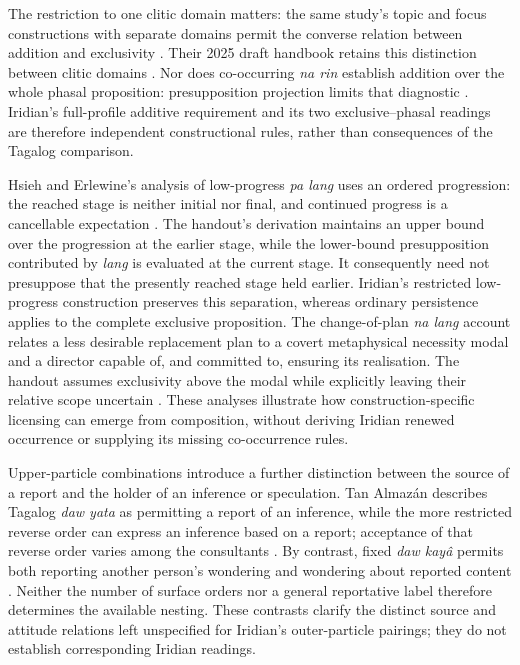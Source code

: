 The restriction to one clitic domain matters: the same study's topic and
focus constructions with separate domains permit the converse relation
between addition and exclusivity \cite[§4.2, fn.~5]{hsieherlewine2024}.
Their 2025 draft handbook retains this distinction between clitic domains
\cite[§4.2]{hsieherlewine2025handbook}. Nor does co-occurring \textit{na rin} establish addition over the whole
phasal proposition: presupposition projection limits that diagnostic
\cite[appendix~A]{hsieherlewine2024}. Iridian's full-profile additive
requirement and its two exclusive--phasal readings are therefore independent
constructional rules, rather than consequences of the Tagalog comparison.

Hsieh and Erlewine's analysis of low-progress \textit{pa lang}
uses an ordered progression: the reached stage is neither initial nor final,
and continued progress is a cancellable expectation
\cite[§4, pp.~5--7]{hsieherlewine2023nthu}. The handout's derivation maintains an upper
bound over the progression at the earlier stage, while the lower-bound
presupposition contributed by \textit{lang} is evaluated at the current
stage. It consequently need not presuppose that the presently reached stage
held earlier. Iridian's restricted low-progress construction preserves this
separation, whereas ordinary persistence applies to the complete exclusive
proposition. The change-of-plan \textit{na lang} account relates a less desirable
replacement plan to a covert metaphysical necessity modal and a director
capable of, and committed to, ensuring its realisation. The handout assumes
exclusivity above the modal while explicitly leaving their relative scope
uncertain \cite[§5, pp.~7--9]{hsieherlewine2023nthu}.
These analyses illustrate how construction-specific licensing can emerge
from composition, without deriving Iridian renewed occurrence or supplying
its missing co-occurrence rules.

Upper-particle combinations introduce a further distinction between the
source of a report and the holder of an inference or speculation. Tan
Almazán describes Tagalog \textit{daw yata} as permitting a report of an
inference, while the more restricted reverse order can express an inference
based on a report; acceptance of that reverse order varies among the
consultants \cite[§3.3.2.2.2, pp.~127--128]{tanalmazan2019}. By contrast,
fixed \textit{daw kayâ} permits both reporting another person's wondering
and wondering about reported content
\cite[§3.3.2.2.3, pp.~128--129]{tanalmazan2019}. Neither the number of
surface orders nor a general reportative label therefore determines the
available nesting. These contrasts clarify the distinct source and attitude
relations left unspecified for Iridian's outer-particle pairings; they
do not establish corresponding Iridian readings.

